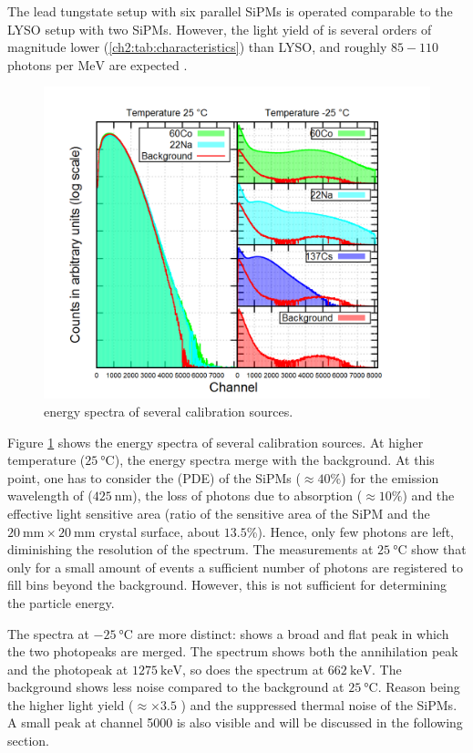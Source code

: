 The lead tungstate setup with six parallel SiPMs is operated comparable to the LYSO setup with two SiPMs. However, the light yield of \pwo{} is several orders of magnitude lower (\ref{ch2:tab:characteristics}) than LYSO, and roughly $85-110$ photons per $\si{\MeV}$ are expected \cite{panda_emctdr}.\par 
\begin{figure}[b!]
	\centering
	\includegraphics[width=1\linewidth]{./plots/energy/pwo_energy.png}
	\caption[\pwo{} energy spectra]{\pwo{} energy spectra of several calibration sources.}
	\label{fig:ch5:pwo_energy}
\end{figure}
Figure \ref{fig:ch5:pwo_energy} shows the energy spectra of several calibration sources. At higher temperature ($\SI{25}{\degreeCelsius}$), the energy spectra merge with the background. At this point, one has to consider the  (PDE) of the SiPMs ($\approx 40\%$) for the emission wavelength of \pwo{} ($\SI{425}{\nano\meter}$), the loss of photons due to absorption ($\approx 10\%$) and the effective light sensitive area (ratio of the sensitive area of the SiPM and the $\SI{20}{\milli\meter}\times\SI{20}{\milli\meter}$ crystal surface, about $13.5$\%). Hence, only few photons are left, diminishing the resolution of the spectrum. The measurements at $\SI{25}{\degreeCelsius}$ show that only for a small amount of events a sufficient number of photons are registered to fill bins beyond the background. However, this is not sufficient for determining the particle energy. \par 
The spectra at $\SI{-25}{\degreeCelsius}$ are more distinct: \co{} shows a broad and flat peak in which the two photopeaks are merged. The \na{} spectrum shows both the annihilation peak and the photopeak at $\SI{1275}{\keV}$, so does the \cs{} spectrum at $\SI{662}{\keV}$. The background shows less noise compared to the background at $\SI{25}{\degreeCelsius}$. Reason being the higher light yield ($\approx \times 3.5$ \cite{panda_emctdr}) and the suppressed thermal noise of the SiPMs. A small peak at channel 5000 is also visible and will be discussed in the following section. \par 
